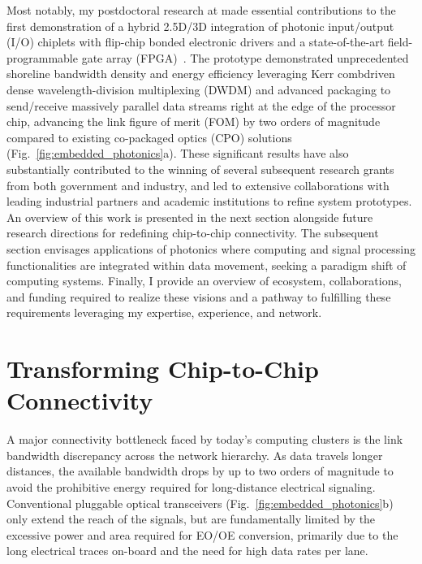 Most notably, my postdoctoral research at \mySchoolShort{} made essential contributions to the first demonstration of a hybrid 2.5D/3D integration of photonic input/output (I/O) chiplets with
flip-chip bonded electronic drivers and a state-of-the-art field-programmable gate array (FPGA)~\cite{wangSiliconPhotonicsChip2024,wangCoDesignedSiliconPhotonics2024,RovinskiISCAS25}. The prototype demonstrated unprecedented shoreline bandwidth density and energy efficiency leveraging Kerr comb\textendash{}driven dense wavelength-division multiplexing (DWDM) and advanced packaging to send/receive massively parallel data streams right at the edge of the processor chip, advancing the link figure of merit (FOM) by two orders of magnitude compared to existing co-packaged optics (CPO) solutions (Fig.~\ref{fig:embedded_photonics}a). These significant results have also substantially contributed to the winning of several subsequent research grants from both government and industry, and led to extensive collaborations with leading industrial partners and academic institutions to refine system prototypes. An overview of this work is presented in the next section alongside future research directions for redefining chip-to-chip connectivity. The subsequent section envisages applications of photonics where computing and signal processing functionalities are integrated within data movement, seeking a paradigm shift of computing systems. Finally, I provide an overview of ecosystem, collaborations, and funding required to realize these visions and a pathway to fulfilling these requirements leveraging my expertise, experience, and network.

\section*{Transforming Chip-to-Chip Connectivity}

A major connectivity bottleneck faced by today's computing clusters is the link bandwidth discrepancy across the network hierarchy. As data travels longer distances, the available bandwidth drops by up to two orders of magnitude to avoid the prohibitive energy required for long-distance electrical signaling. Conventional pluggable optical transceivers (Fig.~\ref{fig:embedded_photonics}b) only extend the reach of the signals, but are fundamentally limited by the excessive power and area required for EO/OE conversion, primarily due to the long electrical traces on-board and the need for high data rates per lane.

